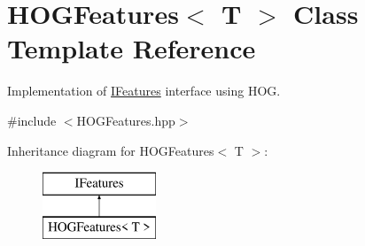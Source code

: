 \hypertarget{classHOGFeatures}{\section{H\-O\-G\-Features$<$ T $>$ Class Template Reference}
\label{classHOGFeatures}
}


Implementation of \hyperlink{classIFeatures}{I\-Features} interface using H\-O\-G.  




{\ttfamily \#include $<$H\-O\-G\-Features.\-hpp$>$}

Inheritance diagram for H\-O\-G\-Features$<$ T $>$\-:\begin{figure}[H]
\begin{center}
\leavevmode
\includegraphics[height=2.000000cm]{classHOGFeatures}
\end{center}
\end{figure}
